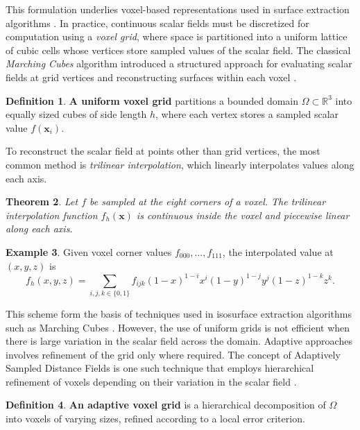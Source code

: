 \documentclass[12pt, a4paper, oneside]{book}
\theoremstyle{plain}
\newtheorem{theorem}{Theorem}[chapter]
\theoremstyle{definition}
\newtheorem{definition}[theorem]{Definition}
\newtheorem{example}[theorem]{Example}
\theoremstyle{remark}
\theoremstyle{definition}
\begin{document}
This formulation underlies voxel-based representations used in surface extraction algorithms \cite{bloomenthal1997introduction,lorensen1998marching}. In practice, continuous scalar fields must be discretized for computation using a \emph{voxel grid}, where space is partitioned into a uniform lattice of cubic cells whose vertices store sampled values of the scalar field. The classical \emph{Marching Cubes} algorithm introduced a structured approach for evaluating scalar fields at grid vertices and reconstructing surfaces within each voxel \cite{lorensen1998marching}.

\begin{definition}
\textbf{A uniform voxel grid} partitions a bounded domain $\Omega \subset \mathbb{R}^3$ into
equally sized cubes of side length $h$, where each vertex stores a sampled scalar value $f(\mathbf{x}_i)$.
\end{definition}

To reconstruct the scalar field at points other than grid vertices, the most common method is \emph{trilinear interpolation}, which linearly interpolates values along each axis.

\begin{theorem}
Let $f$ be sampled at the eight corners of a voxel. The trilinear interpolation function $f_h(\mathbf{x})$ is continuous inside the voxel and piecewise linear along each axis.
\end{theorem}

\begin{example}
    Given voxel corner values $f_{000}, \dots, f_{111}$, the interpolated value at
    $(x,y,z)$ is
\[
f_h(x,y,z) = \sum_{i,j,k \in \{0,1\}} f_{ijk}(1-x)^{1-i}x^i(1-y)^{1-j}y^j
(1-z)^{1-k}z^k.
\]
\end{example}

This scheme form the basis of techniques used in isosurface extraction algorithms such as Marching Cubes \cite{lorensen1998marching}. However, the use of uniform grids is not efficient when there is large variation in the scalar field across the domain. Adaptive approaches involves refinement of the grid only where required. The concept of Adaptively Sampled Distance Fields is one such technique that employs hierarchical refinement of voxels depending on their variation in the scalar field \cite{frisken2000adaptively}.

\begin{definition}
\textbf{An adaptive voxel grid} is a hierarchical decomposition of $\Omega$ into voxels of varying sizes, refined according to a local error criterion.
\end{definition}
\end{document}
